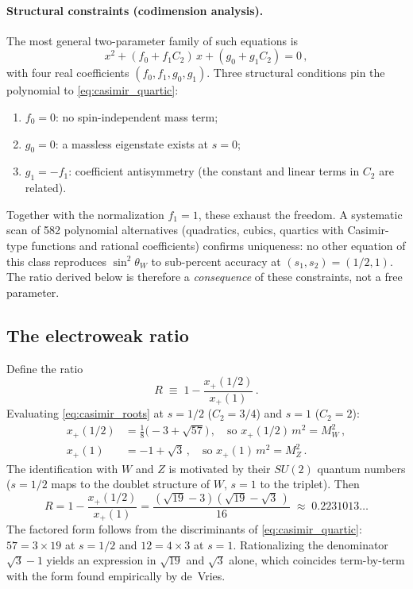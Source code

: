 \documentclass[12pt,a4paper]{article}
\begin{document}
\paragraph{Structural constraints (codimension analysis).}
The most general two-parameter family of such equations is
\begin{equation}
x^2 + (f_0 + f_1 C_2)\,x + (g_0 + g_1 C_2) = 0\,,
\end{equation}
with four real coefficients $(f_0, f_1, g_0, g_1)$.  Three
structural conditions pin the polynomial to \eqref{eq:casimir_quartic}:
\begin{enumerate}
\item $f_0 = 0$: no spin-independent mass term;
\item $g_0 = 0$: a massless eigenstate exists at $s = 0$;
\item $g_1 = -f_1$: coefficient antisymmetry
  (the constant and linear terms in $C_2$ are related).
\end{enumerate}
Together with the normalization $f_1 = 1$, these exhaust the
freedom.  A systematic scan of 582 polynomial alternatives
(quadratics, cubics, quartics with Casimir-type functions and
rational coefficients) confirms uniqueness: no other
equation of this class reproduces $\sin^2\!\theta_W$ to
sub-percent accuracy at $(s_1, s_2) = (1/2, 1)$.
The ratio derived below is therefore a
\emph{consequence} of these constraints, not a free parameter.

\subsection{The electroweak ratio}
Define the ratio
\begin{equation}
R \;\equiv\; 1 - \frac{x_+(1/2)}{x_+(1)}\,.
\end{equation}
Evaluating \eqref{eq:casimir_roots} at $s = 1/2$ ($C_2 = 3/4$)
and $s = 1$ ($C_2 = 2$):
\begin{align}
x_+(1/2) &= \tfrac{1}{8}\bigl(-3 + \sqrt{57}\bigr)
  \,,\quad\text{so } x_+(1/2)\,m^2 = M_W^2\,,
\\[4pt]
x_+(1) &= -1 + \sqrt{3}
  \,,\quad\text{so } x_+(1)\,m^2 = M_Z^2\,.
\end{align}
The identification with $W$ and $Z$ is motivated by their
$SU(2)$ quantum numbers ($s = 1/2$ maps to the doublet structure of $W$,
$s = 1$ to the triplet).  Then
\begin{equation}
R = 1 - \frac{x_+(1/2)}{x_+(1)}
  = \frac{(\sqrt{19} - 3)(\sqrt{19} - \sqrt{3}\,)}{16}
  \;\approx\; 0.2231013\ldots
\end{equation}
The factored form follows from the discriminants of
\eqref{eq:casimir_quartic}: $57 = 3 \times 19$ at $s = 1/2$ and
$12 = 4 \times 3$ at $s = 1$.  Rationalizing the denominator
$\sqrt{3} - 1$ yields an expression in $\sqrt{19}$ and $\sqrt{3}$
alone, which coincides term-by-term with the form found
empirically by de~Vries.
\end{document}
